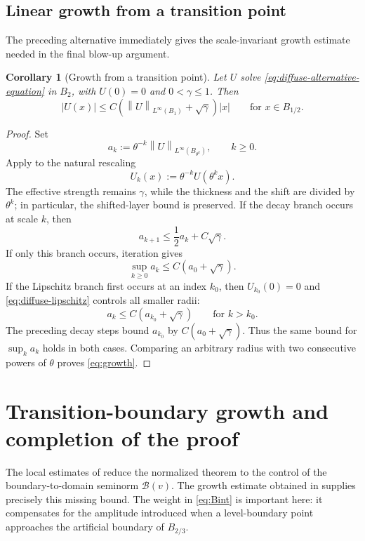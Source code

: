\documentclass[11pt,letterpaper]{amsart}
\numberwithin{equation}{section}
\newcommand{\norm}[1]{\left\lVert #1\right\rVert}
\newtheorem{corollary}[theorem]{Corollary}
\theoremstyle{definition}
\theoremstyle{remark}
\begin{document}
\subsection{Linear growth from a transition point}

The preceding alternative immediately gives the scale-invariant growth
estimate needed in the final blow-up argument.

\begin{corollary}[Growth from a transition point]
\label{cor:growth}
Let $U$ solve \eqref{eq:diffuse-alternative-equation} in $B_2$, with
$U(0)=0$ and $0<\gamma\leq1$. Then
\begin{equation}\label{eq:growth}
|U(x)|
\leq
C\left(
\norm{U}_{L^\infty(B_1)}+\sqrt\gamma
\right)|x|
\qquad\text{for }x\in B_{1/2}.
\end{equation}
\end{corollary}

\begin{proof}
Set
$$
a_k
:=
\theta^{-k}
\norm{U}_{L^\infty(B_{\theta^k})},
\qquad k\geq0.
$$
Apply  to the natural rescaling
$$
U_k(x):=\theta^{-k}U(\theta^kx).
$$
The effective strength remains $\gamma$, while the thickness and the shift
are divided by $\theta^k$; in particular, the shifted-layer bound is
preserved. If the decay branch occurs at scale $k$, then
$$
a_{k+1}
\leq
\frac12a_k+C\sqrt\gamma.
$$
If only this branch occurs, iteration gives
$$
\sup_{k\geq0}a_k
\leq
C(a_0+\sqrt\gamma).
$$
If the Lipschitz branch first occurs at an index $k_0$, then
$U_{k_0}(0)=0$ and \eqref{eq:diffuse-lipschitz} controls all smaller radii:
$$
a_k
\leq
C(a_{k_0}+\sqrt\gamma)
\qquad\text{for }k>k_0.
$$
The preceding decay steps bound $a_{k_0}$ by
$C(a_0+\sqrt\gamma)$. Thus the same bound for $\sup_k a_k$ holds in both
cases. Comparing an arbitrary radius with two consecutive powers of
$\theta$ proves \eqref{eq:growth}.
\end{proof}

\section{Transition-boundary growth and completion of the proof}
\label{sec:completion}

The local estimates of  reduce the normalized
theorem to the control of the boundary-to-domain seminorm $\mathcal B(v)$.
The growth estimate obtained in  supplies precisely this
missing bound. The weight in \eqref{eq:Bint} is important here: it compensates
for the amplitude introduced when a level-boundary point approaches the
artificial boundary of $B_{2/3}$.
\end{document}
